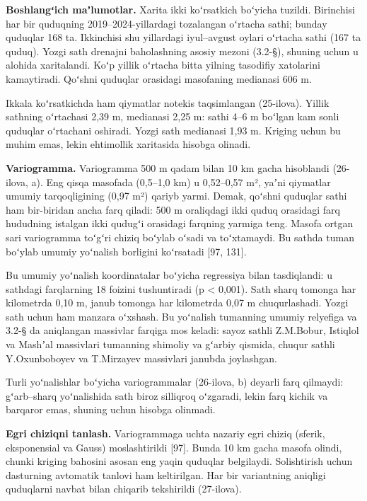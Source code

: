 \documentclass[14pt,a4paper,oneside]{extreport}
\begin{document}
\textbf{Boshlangʻich maʼlumotlar.} Xarita ikki koʻrsatkich boʻyicha
tuzildi. Birinchisi har bir quduqning 2019--2024-yillardagi tozalangan
oʻrtacha sathi; bunday quduqlar 168 ta. Ikkinchisi shu yillardagi
iyul--avgust oylari oʻrtacha sathi (167 ta quduq). Yozgi sath drenajni
baholashning asosiy mezoni (3.2-§), shuning uchun u alohida xaritalandi.
Koʻp yillik oʻrtacha bitta yilning tasodifiy xatolarini kamaytiradi.
Qoʻshni quduqlar orasidagi masofaning medianasi 606 m.

Ikkala koʻrsatkichda ham qiymatlar notekis taqsimlangan (25-ilova).
Yillik sathning oʻrtachasi 2,39 m, medianasi 2,25 m: sathi 4--6 m
boʻlgan kam sonli quduqlar oʻrtachani oshiradi. Yozgi sath medianasi
1,93 m. Kriging uchun bu muhim emas, lekin ehtimollik xaritasida hisobga
olinadi.

\textbf{Variogramma.} Variogramma 500 m qadam bilan 10 km gacha
hisoblandi (26-ilova, a). Eng qisqa masofada (0,5--1,0 km) u 0,52--0,57
m², yaʼni qiymatlar umumiy tarqoqligining (0,97 m²) qariyb yarmi. Demak,
qoʻshni quduqlar sathi ham bir-biridan ancha farq qiladi: 500 m
oraliqdagi ikki quduq orasidagi farq hududning istalgan ikki qudugʻi
orasidagi farqning yarmiga teng. Masofa ortgan sari variogramma toʻgʻri
chiziq boʻylab oʻsadi va toʻxtamaydi. Bu sathda tuman boʻylab umumiy
yoʻnalish borligini koʻrsatadi {[}97, 131{]}.

Bu umumiy yoʻnalish koordinatalar boʻyicha regressiya bilan tasdiqlandi:
u sathdagi farqlarning 18 foizini tushuntiradi (p \textless{} 0,001).
Sath sharq tomonga har kilometrda 0,10 m, janub tomonga har kilometrda
0,07 m chuqurlashadi. Yozgi sath uchun ham manzara oʻxshash. Bu
yoʻnalish tumanning umumiy relyefiga va 3.2-§ da aniqlangan massivlar
farqiga mos keladi: sayoz sathli Z.M.Bobur, Istiqlol va Mashʼal
massivlari tumanning shimoliy va gʻarbiy qismida, chuqur sathli
Y.Oxunboboyev va T.Mirzayev massivlari janubda joylashgan.

Turli yoʻnalishlar boʻyicha variogrammalar (26-ilova, b) deyarli farq
qilmaydi: gʻarb--sharq yoʻnalishida sath biroz silliqroq oʻzgaradi,
lekin farq kichik va barqaror emas, shuning uchun hisobga olinmadi.

\textbf{Egri chiziqni tanlash.} Variogrammaga uchta nazariy egri chiziq
(sferik, eksponensial va Gauss) moslashtirildi {[}97{]}. Bunda 10 km
gacha masofa olindi, chunki kriging bahosini asosan eng yaqin quduqlar
belgilaydi. Solishtirish uchun dasturning avtomatik tanlovi ham
keltirilgan. Har bir variantning aniqligi quduqlarni navbat bilan
chiqarib tekshirildi (27-ilova).
\end{document}
